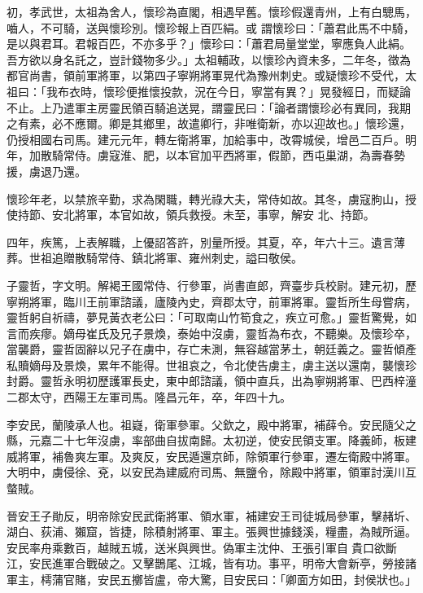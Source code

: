 \begin{pinyinscope}
 初，孝武世，太祖為舍人，懷珍為直閣，相遇早舊。懷珍假還青州，上有白驄馬，嚙人，不可騎，送與懷珍別。懷珍報上百匹絹。或
 謂懷珍曰：「蕭君此馬不中騎，是以與君耳。君報百匹，不亦多乎？」懷珍曰：「蕭君局量堂堂，寧應負人此絹。吾方欲以身名託之，豈計錢物多少。」太祖輔政，以懷珍內資未多，二年冬，徵為都官尚書，領前軍將軍，以第四子寧朔將軍晃代為豫州刺史。或疑懷珍不受代，太祖曰：「我布衣時，懷珍便推懷投款，況在今日，寧當有異？」晃發經日，而疑論不止。上乃遣軍主房靈民領百騎追送晃，謂靈民曰：「論者謂懷珍必有異同，我期之有素，必不應爾。卿是其鄉里，故遣卿行，非唯衛新，亦以迎故也。」懷珍還，仍授相國右司馬。建元元年，轉左衛將軍，加給事中，改霄城侯，增邑二百戶。明年，加散騎常侍。虜寇淮、肥，以本官加平西將軍，假節，西屯巢湖，為壽春勢援，虜退乃還。



 懷珍年老，以禁旅辛勤，求為閑職，轉光祿大夫，常侍如故。其冬，虜寇朐山，授使持節、安北將軍，本官如故，領兵救授。未至，事寧，解安
 北、持節。



 四年，疾篤，上表解職，上優詔答許，別量所授。其夏，卒，年六十三。遺言薄葬。世祖追贈散騎常侍、鎮北將軍、雍州刺史，謚曰敬侯。



 子靈哲，字文明。解褐王國常侍、行參軍，尚書直郎，齊臺步兵校尉。建元初，歷寧朔將軍，臨川王前軍諮議，廬陵內史，齊郡太守，前軍將軍。靈哲所生母嘗病，靈哲躬自祈禱，夢見黃衣老公曰：「可取南山竹筍食之，疾立可愈。」靈哲驚覺，如言而疾瘳。嫡母崔氏及兄子景煥，泰始中沒虜，靈哲為布衣，不聽樂。及懷珍卒，當襲爵，靈哲固辭以兄子在虜中，存亡未測，無容越當茅土，朝廷義之。靈哲傾產私贖嫡母及景煥，累年不能得。世祖哀之，令北使告虜主，虜主送以還南，襲懷珍封爵。靈哲永明初歷護軍長史，東中郎諮議，領中直兵，出為寧朔將軍、巴西梓潼二郡太守，西陽王左軍司馬。隆昌元年，卒，年四十九。



 李安民，蘭陵承人也。祖嶷，衛軍參軍。父欽之，殿中將軍，補薛令。安民隨父之縣，元嘉二十七年沒虜，率部曲自拔南歸。太初逆，使安民領支軍。降義師，板建威將軍，補魯爽左軍。及爽反，安民遁還京師，除領軍行參軍，遷左衛殿中將軍。大明中，虜侵徐、兗，以安民為建威府司馬、無鹽令，除殿中將軍，領軍討漢川互螫賊。



 晉安王子勛反，明帝除安民武衛將軍、領水軍，補建安王司徒城局參軍，擊赭圻、湖白、荻浦、獺窟，皆捷，除積射將軍、軍主。張興世據錢溪，糧盡，為賊所逼。安民率舟乘數百，越賊五城，送米與興世。偽軍主沈仲、王張引軍自貴口欲斷江，安民進軍合戰破之。又擊鵲尾、江城，皆有功。事平，明帝大會新亭，勞接諸軍主，樗蒲官賭，安民五擲皆盧，帝大驚，目安民曰：「卿面方如田，封侯狀也。」




\end{pinyinscope}
